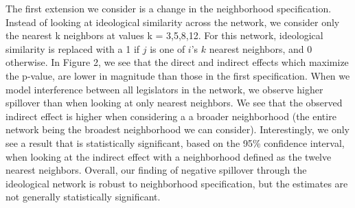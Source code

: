 \documentclass[12pt]{article}
\begin{document}
The first extension we consider is a change in the neighborhood specification. Instead of looking at ideological similarity across the network,  we consider only the nearest k neighbors at values k = 3,5,8,12.  For this network, ideological similarity is replaced with a 1 if $j$ is one of $i$'s $k$ nearest neighbors, and 0 otherwise. In Figure 2, we see that the direct and indirect effects which maximize the p-value, are lower in magnitude than those in the first specification. When we model interference between all legislators in the network, we observe higher spillover than when looking at only nearest neighbors. We see that the observed indirect effect is higher when considering a a broader neighborhood (the entire network being the broadest neighborhood we can consider).  Interestingly, we only see a result that is statistically significant, based on the 95\% confidence interval, when looking at the indirect effect with a neighborhood defined as the twelve nearest neighbors. Overall, our finding of negative spillover through the ideological network is robust to neighborhood specification, but the estimates are not generally statistically significant.
 
\end{document}

